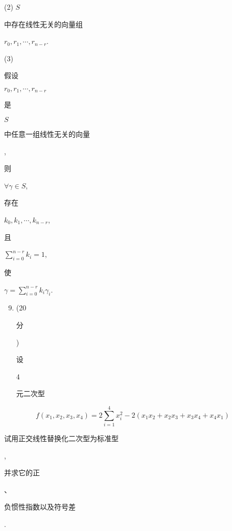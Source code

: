 \documentclass[10pt]{article}
\begin{document}
(2) $S$ \begin{CJK}{UTF8}{mj}中存在线性无关的向量组\end{CJK} $r_{0}, r_{1}, \cdots, r_{n-r}$.

(3) \begin{CJK}{UTF8}{mj}假设\end{CJK} $r_{0}, r_{1}, \cdots, r_{n-r}$ \begin{CJK}{UTF8}{mj}是\end{CJK} $S$ \begin{CJK}{UTF8}{mj}中任意一组线性无关的向量\end{CJK}, \begin{CJK}{UTF8}{mj}则\end{CJK} $\forall \gamma \in S$, \begin{CJK}{UTF8}{mj}存在\end{CJK} $k_{0}, k_{1}, \cdots, k_{n-r}$, \begin{CJK}{UTF8}{mj}且\end{CJK} $\sum_{i=0}^{n-r} k_{i}=1$, \begin{CJK}{UTF8}{mj}使\end{CJK} $\gamma=\sum_{i=0}^{n-r} k_{i} \gamma_{i}$.

\begin{enumerate}
  \setcounter{enumi}{8}
  \item (20 \begin{CJK}{UTF8}{mj}分\end{CJK}) \begin{CJK}{UTF8}{mj}设\end{CJK} 4 \begin{CJK}{UTF8}{mj}元二次型\end{CJK}
\end{enumerate}
$$
f\left(x_{1}, x_{2}, x_{3}, x_{4}\right)=2 \sum_{i=1}^{4} x_{i}^{2}-2\left(x_{1} x_{2}+x_{2} x_{3}+x_{3} x_{4}+x_{4} x_{1}\right)
$$
\begin{CJK}{UTF8}{mj}试用正交线性替换化二次型为标准型\end{CJK}, \begin{CJK}{UTF8}{mj}并求它的正\end{CJK}、\begin{CJK}{UTF8}{mj}负惯性指数以及符号差\end{CJK}.
\end{document}
